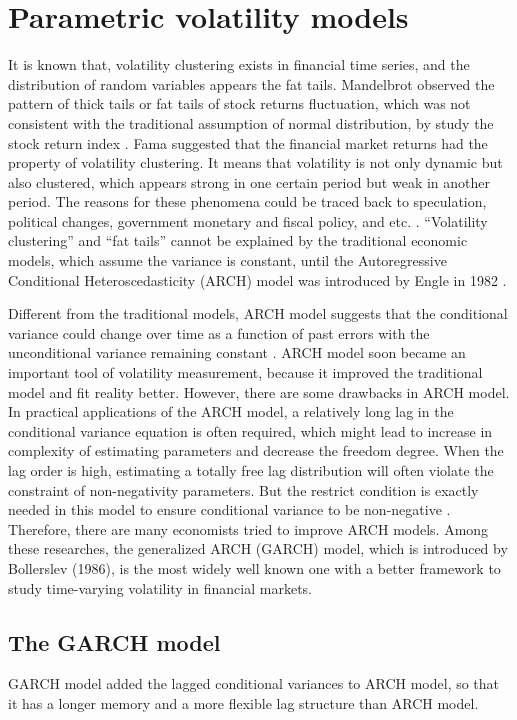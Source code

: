 \chapter{Parametric volatility models}\label{secGarchmodel}
It is known that, volatility clustering exists in financial time series, and the distribution of random variables appears the fat tails. Mandelbrot observed the pattern of thick tails or fat tails of stock returns fluctuation, which was not consistent with the traditional assumption of normal distribution, by study the stock return index \citep{Mandelbrot1963}. 
Fama suggested that the financial market returns had the property of volatility clustering. It means that volatility is not only dynamic but also clustered, which appears strong in one certain period but weak in another period. The reasons for these phenomena could be traced back to speculation, political changes, government monetary and fiscal policy, and etc. \citep{EugeneF.Fama1965}. ``Volatility clustering'' and ``fat tails'' cannot be explained by the traditional economic models, which assume the variance is constant, until the Autoregressive Conditional Heteroscedasticity (ARCH) model was introduced by Engle in 1982 \citep{Bollerslev1992}.


Different from the traditional models, ARCH model suggests that the conditional variance could change over time as a function of past errors with the unconditional variance remaining constant \citep{Engle1982}. ARCH model soon became an important tool of volatility measurement, because it improved the traditional model and fit reality better. However, there are some drawbacks in ARCH model. In practical applications of the ARCH model, a relatively long lag in the conditional variance equation is often required, which might lead to increase in complexity of estimating parameters and decrease the freedom degree. When the lag order is high, estimating a totally free lag distribution will often violate the constraint of non-negativity parameters. But the restrict condition is exactly needed in this model to ensure conditional variance to be non-negative \citep{Bollerslev1986}. Therefore, there are many economists tried to improve ARCH models. Among these researches, the generalized ARCH (GARCH) model, which is introduced by Bollerslev (1986), is the most widely well known one with a better framework to study time-varying volatility in financial markets. 

\section{The GARCH model}
GARCH model added the lagged conditional variances to ARCH model, so that it has a longer memory and a more flexible lag structure than ARCH model.

